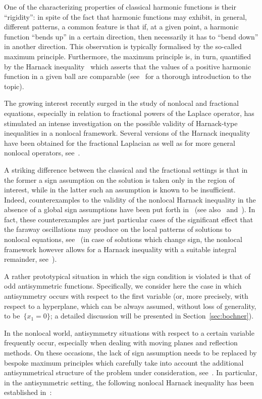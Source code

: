 \documentclass[a4paper,12pt,reqno]{amsart}
\numberwithin{equation}{section}
\theoremstyle{definition}
\theoremstyle{notation}
\begin{document}
One of the characterizing properties of classical harmonic functions is their ``rigidity'': in spite of the fact that harmonic functions may exhibit, in general, different patterns, a common feature is that if, at a given point, a harmonic function ``bends up'' in a certain direction, then necessarily it has to ``bend down'' in another direction. This observation is typically formalised by the so-called maximum principle. Furthermore, the maximum principle is, in turn, quantified by the Harnack inequality~\cite{HAR} which asserts that the values of a positive harmonic function in a given ball are comparable (see~\cite{MK} for a thorough introduction to the topic).


The growing interest recently surged in 
the study of nonlocal and fractional equations, especially in relation to fractional powers of the Laplace operator,
has stimulated an intense investigation on the possible validity of Harnack-type inequalities in a nonlocal framework.
Several versions of the Harnack inequality have been obtained for the fractional Laplacian as well as for more general nonlocal operators, see~\cite{BASS02, BOG03, SON04, BASS05, SIL06, CS07, STI10, DICA14, FER15}.\medskip


A striking difference between the classical and the fractional settings is that in the former
a sign assumption on the solution is taken only in the region of interest, while in the
latter such an assumption is known to be insufficient. Indeed, counterexamples to the validity of the nonlocal
Harnack inequality in the absence of a global sign assumptions have been put forth in~\cite{MK7} (see also~\cite[Theorem~3.3.1]{BUC} and~\cite[Theorem~2.2]{MK11}). In fact,
these counterexamples are just particular cases
of the significant effect that the faraway oscillations may produce
on the local patterns of solutions to nonlocal equations,
see~\cite{DSV, DSV2}
(in case of solutions which change sign, the nonlocal framework however allows
for a Harnack inequality with a suitable integral remainder, see~\cite[Theorem~2.3]{MK11}).\medskip


A rather prototypical situation in which the sign condition is violated is that of odd antisymmetric functions. 
Specifically, we consider here the case in which
antisymmetry occurs with respect to the first variable
(or, more precisely,
with respect to a hyperplane, which can be always assumed, without loss of generality, to be~$ \{x_1 = 0\}$; a detailed discussion will be presented in Section~\ref{sec:bochner}).


In the nonlocal world, 
antisymmetry situations with respect to a certain variable
frequently occur, especially when dealing with moving planes and reflection methods. On these occasions, the lack of sign assumption needs to be replaced by bespoke maximum principles which carefully take into account the additional antisymmetrical structure of the problem under consideration, see~\cite{FALL15, SV16, CO20, FEL20, FEL21, TR24}.
In particular, in the antisymmetric setting, the following
nonlocal Harnack inequality has been established in~\cite{dtv}:
\end{document}
